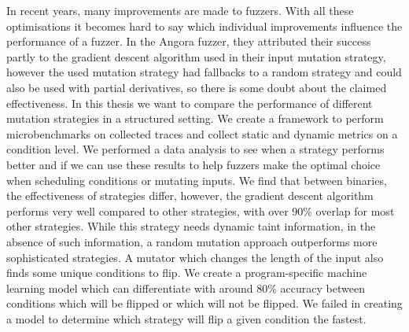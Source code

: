 


\begin{abstracts}        %
In recent years, many improvements are made to fuzzers. With all these optimisations it becomes hard to say which individual improvements influence the performance of a fuzzer. In the Angora fuzzer, they attributed their success partly to the gradient descent algorithm used in their input mutation strategy, however the used mutation strategy had fallbacks to a random strategy and could also be used with partial derivatives, so there is some doubt about the claimed effectiveness. In this thesis we want to compare the performance of different mutation strategies in a structured setting. We create a framework to perform microbenchmarks on collected traces and collect static and dynamic metrics on a condition level. We performed a data analysis to see when a strategy performs better and if we can use these results to help fuzzers make the optimal choice when scheduling conditions or mutating inputs.
We find that between binaries, the effectiveness of strategies differ, however, the gradient descent algorithm performs very well compared to other strategies, with over 90\% overlap for most other strategies. While this strategy needs dynamic taint information, in the absence of such information, a random mutation approach outperforms more sophisticated strategies. A mutator which changes the length of the input also finds some unique conditions to flip. We create a program-specific machine learning model which can differentiate with around 80\% accuracy between conditions which will be flipped or which will not be flipped. We failed in creating a model to determine which strategy will flip a given condition the fastest.
\end{abstracts}


